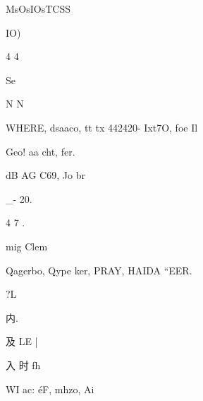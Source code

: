 \documentclass[UTF8,12pt,a4paper,openany]{ctexbook}
\begin{document}
\begin{enumerate}[label=\textbf{\arabic*.},leftmargin=2em]
MsOsIOsTCSS\par IO)\par 4          4\par Se\par N              N\par WHERE, dsaaco, tt tx 442420- Ixt7O, foe Il\par Geo! aa cht, fer.\par dB AG C69, Jo br\par \_-  20.\par 4          7      .\par mig Clem\par Qagerbo, Qype ker, PRAY, HAIDA “EER.\par ?L\par 内.\par 及 LE |\par 入       时       fh\par WI ac: éF, mhzo, Ai
\end{enumerate}
\end{document}
